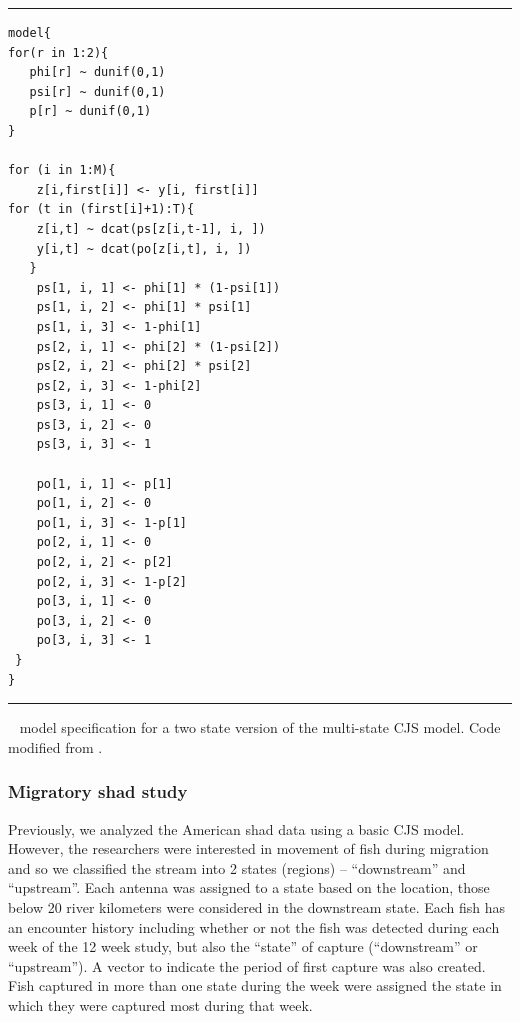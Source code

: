 \begin{panel}[htp]
\centering
\rule[0.1in]{\textwidth}{.03in}
{\small
\begin{verbatim}
model{
for(r in 1:2){
   phi[r] ~ dunif(0,1)
   psi[r] ~ dunif(0,1)
   p[r] ~ dunif(0,1)
}

for (i in 1:M){
    z[i,first[i]] <- y[i, first[i]]
for (t in (first[i]+1):T){
    z[i,t] ~ dcat(ps[z[i,t-1], i, ])
    y[i,t] ~ dcat(po[z[i,t], i, ])
   }
	ps[1, i, 1] <- phi[1] * (1-psi[1])
	ps[1, i, 2] <- phi[1] * psi[1]
	ps[1, i, 3] <- 1-phi[1]
	ps[2, i, 1] <- phi[2] * (1-psi[2])
	ps[2, i, 2] <- phi[2] * psi[2]
	ps[2, i, 3] <- 1-phi[2]
	ps[3, i, 1] <- 0
	ps[3, i, 2] <- 0
	ps[3, i, 3] <- 1

	po[1, i, 1] <- p[1]
	po[1, i, 2] <- 0
	po[1, i, 3] <- 1-p[1]
	po[2, i, 1] <- 0
	po[2, i, 2] <- p[2]
	po[2, i, 3] <- 1-p[2]
	po[3, i, 1] <- 0
	po[3, i, 2] <- 0
	po[3, i, 3] <- 1
 }
}
\end{verbatim}
}
\rule[-0.1in]{\textwidth}{.03in}
\caption{
\jags~ model specification for a two state version of the multi-state
CJS model. Code modified 
from \cite[][Chapt. 9]{kery_schaub:2011}. }
\label{open.panel.msCJS}
\end{panel}


\subsubsection{Migratory shad study}

Previously, we analyzed the American shad data using a basic CJS
model.  However, the researchers were interested in movement of fish
during migration and so we classified the stream into 2 states
(regions) -- ``downstream'' and ``upstream''.  Each antenna was assigned
to a state based on the location, those below 20 river kilometers were
considered in the downstream state.  Each fish has an encounter
history including whether or not the fish was detected during each
week of the 12 week study, but also the ``state'' of capture
(``downstream'' or ``upstream'').  A vector to indicate the
period of first capture was also created.  Fish captured in more than
one state during the week were assigned the state in which they were
captured most during that week.



